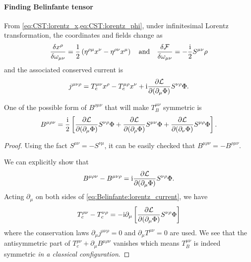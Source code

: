 \documentclass[10pt]{article}
\newcommand{\ii}{\mathrm{i}}
\begin{document}
\paragraph{Finding Belinfante tensor}
From \cref{eq:CST:lorentz_x,eq:CST:lorentz_phi}, under infinitesimal Lorentz transformation, the coordinates and fields change as
\begin{align}
    \fdv{x^\rho}{\omega_{\mu\nu}}=\frac{1}{2}\left(\eta^{\rho\mu}x^\nu-\eta^{\rho\nu}x^\mu\right)\qand\fdv{\mathcal{F}}{\omega_{\mu\nu}}=-\frac{\ii}{2}S^{\mu\nu}\rho
\end{align}
and the associated conserved current is
\begin{align}
    j^{\mu\nu\rho}=T^{\mu\nu}_c x^\rho-T^{\mu\rho}_c x^\nu+\ii\pdv{\mathcal{L}}{(\partial_\mu\Phi)}S^{\nu\rho}\Phi.\label{eq:Belinfante:lorentz_current}
\end{align}
\begin{claim}
    One of the possible form of $B^{\rho\mu\nu}$ that will make $T^{\mu\nu}_B$ symmetric is
    \begin{align}
        B^{\mu\rho\nu}=\frac{\ii}{2}\left[\pdv{\mathcal{L}}{(\partial_\mu\Phi)}S^{\nu\rho}\Phi+\pdv{\mathcal{L}}{(\partial_\rho\Phi)}S^{\mu\nu}\Phi+\pdv{\mathcal{L}}{(\partial_\nu\Phi)}S^{\mu\rho}\Phi\right].\label{eq:Belinfante:B}
    \end{align}
\end{claim}
\begin{proof}
    Using the fact $S^{\mu\nu}=-S^{\nu\mu}$, it can be easily checked that $B^{\mu\rho\nu}=-B^{\rho\mu\nu}$.
    
    We can explicitly show that
    \begin{align}
        B^{\mu\rho\nu}-B^{\mu\nu\rho}=\ii\pdv{\mathcal{L}}{(\partial_\mu\Phi)}S^{\nu\rho}\Phi.
    \end{align}
    Acting $\partial_\mu$ on both sides of \cref{eq:Belinfante:lorentz_current}, we have
    \begin{align}
        T^{\rho\nu}_c-T^{\nu\rho}_c=-\ii\partial_\mu\left[\pdv{\mathcal{L}}{(\partial_\mu\Phi)}S^{\nu\rho}\Phi\right]
    \end{align}
    where the conservation laws $\partial_\mu j^{\mu\nu\rho}=0$ and $\partial_\mu T^{\mu\nu}=0$ are used.
    We see that the antisymmetric part of $T^{\rho\nu}_c+\partial_\mu B^{\mu\rho\nu}$ vanishes which means $T^{\mu\nu}_B$ is indeed symmetric \textit{in a classical configuration}\snm.
\end{proof}
\end{document}
